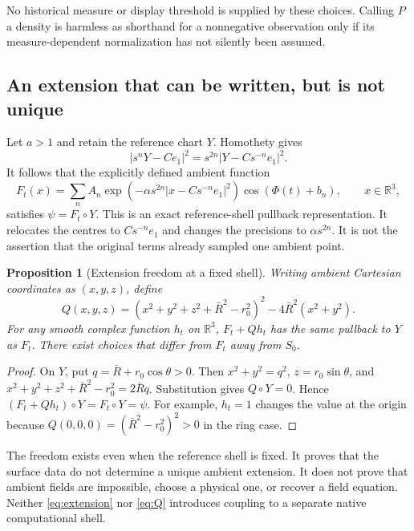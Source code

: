 \documentclass[11pt,a4paper]{article}
\newtheorem{proposition}[theorem]{Proposition}
\theoremstyle{definition}
\theoremstyle{remark}
\newcommand{\R}{\mathbb R}
\begin{document}
No historical measure or display threshold is supplied by
these choices. Calling $P$ a density is harmless as shorthand
for a nonnegative observation only if its measure-dependent
normalization has not silently been assumed.

\subsection{An extension that can be written, but is not unique}
Let $a>1$ and retain the reference chart $Y$. Homothety gives
\[
 |s^nY-Ce_1|^2=s^{2n}|Y-Cs^{-n}e_1|^2.
 \]
It follows that the explicitly defined ambient function
\begin{equation}
 F_t(x)=\sum_n A_n
   \exp\!\left(-\alpha s^{2n}|x-Cs^{-n}e_1|^2\right)
        \cos(\Phi(t)+b_n),\qquad x\in\R^3,
 \label{eq:extension}
\end{equation}
satisfies $\psi=F_t\circ Y$. This is an exact reference-shell
pullback representation. It relocates the centres to
$Cs^{-n}e_1$ and changes the precisions to $\alpha s^{2n}$.
It is not the assertion that the original terms already sampled
one ambient point.

\begin{proposition}[Extension freedom at a fixed shell]
\label{prop:extension}
Writing ambient Cartesian coordinates as $(x,y,z)$, define
\begin{equation}
 Q(x,y,z)=
 (x^2+y^2+z^2+\bar R^2-r_0^2)^2
           -4\bar R^2(x^2+y^2).
 \label{eq:Q}
\end{equation}
For any smooth complex function $h_t$ on $\R^3$,
$F_t+Qh_t$ has the same pullback to $Y$ as $F_t$.
There exist choices that differ from $F_t$ away from $S_0$.
\end{proposition}
\begin{proof}
On $Y$, put $q=\bar R+r_0\cos\theta>0$. Then
$x^2+y^2=q^2$, $z=r_0\sin\theta$, and
$x^2+y^2+z^2+\bar R^2-r_0^2=2\bar Rq$.
Substitution gives $Q\circ Y=0$. Hence
$(F_t+Qh_t)\circ Y=F_t\circ Y=\psi$.
For example, $h_t=1$ changes the value at the origin because
$Q(0,0,0)=(\bar R^2-r_0^2)^2>0$ in the ring case.
\end{proof}

The freedom exists even when the reference shell is fixed.
It proves that the surface data do not determine a unique
ambient extension. It does not prove that ambient fields are
impossible, choose a physical one, or recover a field equation.
Neither \eqref{eq:extension} nor \eqref{eq:Q} introduces coupling
to a separate native computational shell.
\end{document}
